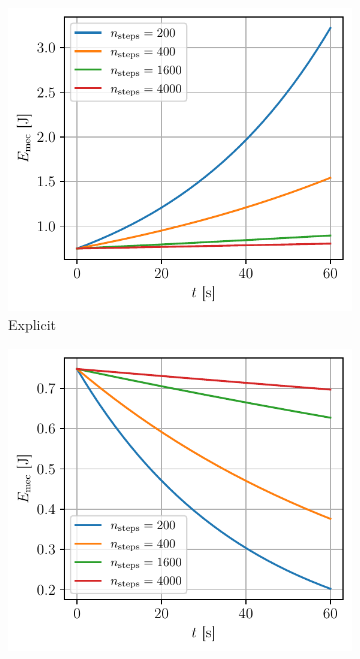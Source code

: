 \begin{figure}[h]
    \centering
    \begin{subfigure}{0.5\linewidth}
        \centering
        \includegraphics[width=\linewidth]{figures/nograv_energy_explicit.pdf}
        \caption{Explicit}
    \end{subfigure}%
    \begin{subfigure}{0.5\linewidth}
        \centering
        \includegraphics[width=\linewidth]{figures/nograv_energy_implicit.pdf}

\end{subfigure}
\end{figure}
